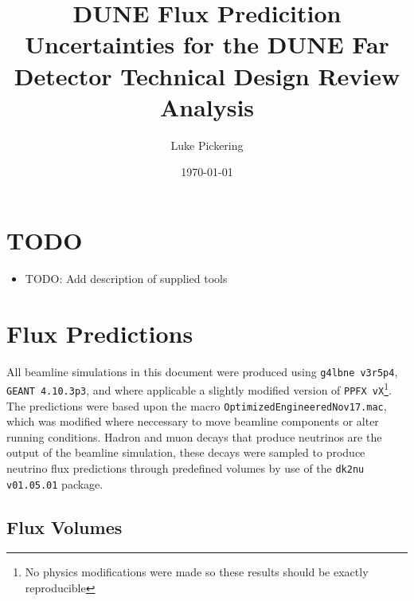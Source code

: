 \documentclass{article}
\title{DUNE Flux Predicition Uncertainties for the DUNE Far Detector Technical Design Review Analysis}
\author{Luke Pickering}
\date{\today}
\begin{document}
\maketitle


\section{TODO}

\begin{itemize}
\item TODO: Add description of supplied tools
\end{itemize}

\section{Flux Predictions}

All beamline simulations in this document were produced using \texttt{g4lbne v3r5p4}, \texttt{GEANT 4.10.3p3}, and where applicable a slightly modified version of \texttt{PPFX vX}\footnote{No physics modifications were made so these results should be exactly reproducible}. The predictions were based upon the macro \texttt{OptimizedEngineeredNov17.mac}, which was modified where neccessary to move beamline components or alter running conditions. Hadron and muon decays that produce neutrinos are the output of the beamline simulation, these decays were sampled to produce neutrino flux predictions through predefined volumes by use of the \texttt{dk2nu v01.05.01} package.

\subsection{Flux Volumes}
\end{document}
